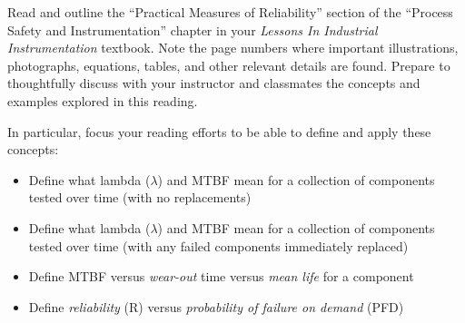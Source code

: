 

Read and outline the ``Practical Measures of Reliability'' section of the ``Process Safety and Instrumentation'' chapter in your {\it Lessons In Industrial Instrumentation} textbook.  Note the page numbers where important illustrations, photographs, equations, tables, and other relevant details are found.  Prepare to thoughtfully discuss with your instructor and classmates the concepts and examples explored in this reading.

\vskip 20pt

\noindent
In particular, focus your reading efforts to be able to define and apply these concepts:

\begin{itemize}
\item{} Define what lambda ($\lambda$) and MTBF mean for a collection of components tested over time (with no replacements)
\vskip 5pt
\item{} Define what lambda ($\lambda$) and MTBF mean for a collection of components tested over time (with any failed components immediately replaced)
\vskip 5pt
\item{} Define MTBF versus {\it wear-out} time versus {\it mean life} for a component
\vskip 5pt
\item{} Define {\it reliability} (R) versus {\it probability of failure on demand} (PFD)
\end{itemize}

















